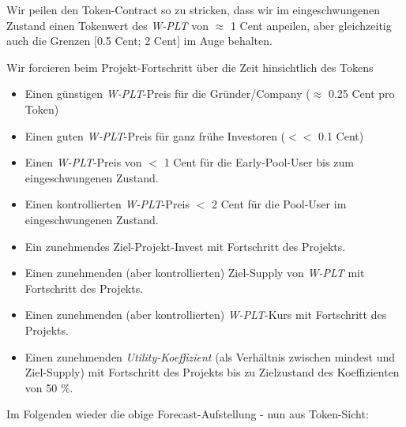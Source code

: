 \begin{Example}

\vspace{0.75cm}


\vspace{0.75cm}

Wir peilen den Token-Contract so zu stricken, dass wir im eingeschwungenen Zustand einen Tokenwert des \textit{W-PLT} von $\approx$ 1 Cent anpeilen, aber gleichzeitig auch die Grenzen $[$0.5 Cent; 2 Cent$]$ im Auge behalten.

\vspace{0.5cm}

Wir forcieren beim Projekt-Fortschritt über die Zeit hinsichtlich des Tokens

\begin{itemize}
	\item Einen günstigen \textit{W-PLT}-Preis für die Gründer/Company ($\approx$ 0.25 Cent pro Token)
	\item Einen guten \textit{W-PLT}-Preis für ganz frühe Investoren ($<<$ 0.1 Cent)
	\item Einen \textit{W-PLT}-Preis von $<$ 1 Cent für die Early-Pool-User bis zum eingeschwungenen Zustand.
	\item Einen kontrollierten \textit{W-PLT}-Preis $<$ 2 Cent für die Pool-User im eingeschwungenen Zustand.
	\item Ein zunehmendes Ziel-Projekt-Invest mit Fortschritt des Projekts.
	\item Einen zunehmenden (aber kontrollierten) Ziel-Supply von \textit{W-PLT} mit Fortschritt des Projekts.
	\item Einen zunehmenden (aber kontrollierten) \textit{W-PLT}-Kurs mit Fortschritt des Projekts.
	\item Einen zunehmenden \textit{Utility-Koeffizient} (als Verhältnis zwischen mindest und Ziel-Supply) mit Fortschritt des Projekts bis zu Zielzustand des Koeffizienten von 50 \%.
\end{itemize}

\vspace{1.0cm}

Im Folgenden wieder die obige Forecast-Aufstellung - nun aus Token-Sicht:



\end{Example}
